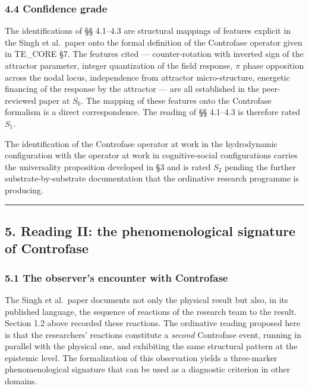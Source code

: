 \documentclass[
  11pt,
  a4paper,
]{article}
\begin{document}
\subsubsection{4.4 Confidence grade}\label{confidence-grade}

The identifications of §§ 4.1--4.3 are structural mappings of features
explicit in the Singh et al.~paper onto the formal definition of the
Controfase operator given in TE\_CORE §7. The features cited ---
counter-rotation with inverted sign of the attractor parameter, integer
quantization of the field response, \(\pi\) phase opposition across the
nodal locus, independence from attractor micro-structure, energetic
financing of the response by the attractor --- are all established in
the peer-reviewed paper at \(S_0\). The mapping of these features onto
the Controfase formalism is a direct correspondence. The reading of §§
4.1--4.3 is therefore rated \(S_1\).

The identification of the Controfase operator at work in the
hydrodynamic configuration with the operator at work in cognitive-social
configurations carries the universality proposition developed in §3 and
is rated \(S_2\) pending the further substrate-by-substrate
documentation that the ordinative research programme is producing.

\begin{center}\rule{0.5\linewidth}{0.5pt}\end{center}

\subsection{5. Reading II: the phenomenological signature of
Controfase}\label{reading-ii-the-phenomenological-signature-of-controfase}

\subsubsection{5.1 The observer's encounter with
Controfase}\label{the-observers-encounter-with-controfase}

The Singh et al.~paper documents not only the physical result but also,
in its published language, the sequence of reactions of the research
team to the result. Section 1.2 above recorded these reactions. The
ordinative reading proposed here is that the researchers' reactions
constitute a \emph{second} Controfase event, running in parallel with
the physical one, and exhibiting the same structural pattern at the
epistemic level. The formalization of this observation yields a
three-marker phenomenological signature that can be used as a diagnostic
criterion in other domains.
\end{document}
